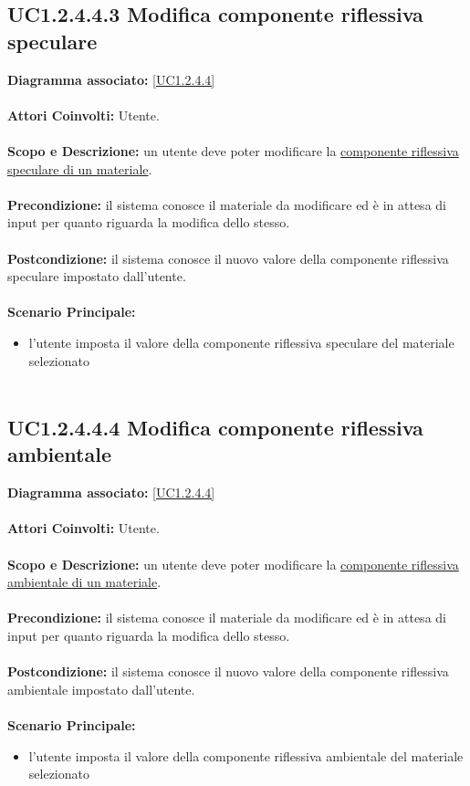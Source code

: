 \subsection{UC1.2.4.4.3 Modifica componente riflessiva speculare}
\textbf{Diagramma associato:}
\ref{UC1.2.4.4} \\ \\
\textbf{Attori Coinvolti:}
Utente. \\ \\
\textbf{Scopo e Descrizione:}
un utente deve poter modificare la \underline{componente riflessiva speculare di un materiale}. \\ \\
\textbf{Precondizione:}
il sistema conosce il materiale da modificare ed è in attesa di input per quanto riguarda la modifica dello stesso. \\ \\
\textbf{Postcondizione:}
il sistema conosce il nuovo valore della componente riflessiva speculare impostato dall'utente. \\ \\
\textbf{Scenario Principale:}
\begin{itemize}
\item l'utente imposta il valore della componente riflessiva speculare del materiale selezionato
\\ \\ \end{itemize}


\subsection{UC1.2.4.4.4 Modifica componente riflessiva ambientale}
\textbf{Diagramma associato:}
\ref{UC1.2.4.4} \\ \\
\textbf{Attori Coinvolti:}
Utente. \\ \\
\textbf{Scopo e Descrizione:}
un utente deve poter modificare la \underline{componente riflessiva ambientale di un materiale}. \\ \\
\textbf{Precondizione:}
il sistema conosce il materiale da modificare ed è in attesa di input per quanto riguarda la modifica dello stesso. \\ \\
\textbf{Postcondizione:}
il sistema conosce il nuovo valore della componente riflessiva ambientale impostato dall'utente. \\ \\
\textbf{Scenario Principale:}
\begin{itemize}
\item l'utente imposta il valore della componente riflessiva ambientale del materiale selezionato
\\ \\ \end{itemize}


